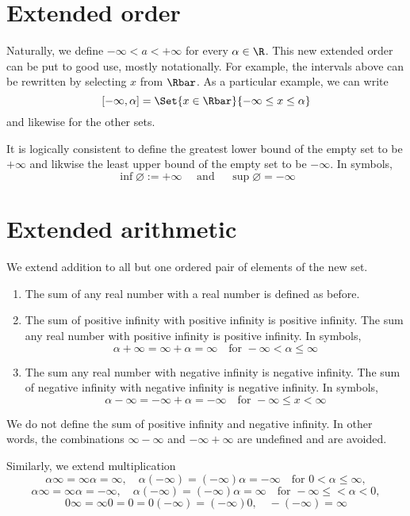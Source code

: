   \section*{Extended order}

Naturally, we define $-\infty < a < +\infty$ for every $\alpha \in \R $.
This new extended order can be put to good use, mostly notationally.
For example, the intervals above can be rewritten by selecting $x$ from $\Rbar$.
As a particular example, we can write
\[
[-\infty, \alpha ] =\Set{x \in \Rbar}{-\infty \leq x \leq \alpha }
\]
and likewise for the other sets.

It is logically consistent to define the greatest lower bound of the empty set to be $+\infty$ and likwise the least upper bound of the empty set to be $-\infty$.
In symbols,
\[
\inf \varnothing := +\infty \quad \text{ and } \quad \sup \varnothing = -\infty
\]

  \section*{Extended arithmetic}

We extend addition to all but one ordered pair of elements of the new set.
    \begin{enumerate}
      \item The sum of any real number with a real number is defined as before.
      \item The sum of positive infinity with positive infinity is positive infinity.
The sum any real number with positive infinity is positive infinity.
In symbols,
\[
\alpha  + \infty = \infty + \alpha  = \infty \quad \text{for } -\infty < \alpha  \leq \infty
\]
      \item The sum any real number with negative infinity is negative infinity.
The sum of negative infinity with negative infinity is negative infinity.
In symbols,
\[
\alpha  - \infty = -\infty + \alpha  = -\infty \quad \text{for } -\infty \leq x < \infty
\]
    \end{enumerate}
We do not define the sum of positive infinity and negative infinity.
In other words, the combinations $\infty - \infty$ and $-\infty + \infty$ are undefined and are avoided.

Similarly, we extend multiplication
\[
\alpha \infty = \infty\alpha  = \infty, \quad \alpha (-\infty) = (-\infty)\alpha  = -\infty \quad \text{for } 0 < \alpha  \leq \infty,
\]
\[
\alpha \infty = \infty\alpha  = -\infty, \quad \alpha (-\infty) = (-\infty)\alpha  = \infty \quad \text{for } -\infty \leq < \alpha  < 0,
\]
\[
0\infty = \infty0 = 0 = 0(-\infty) = (-\infty)0, \quad -(-\infty) = \infty
\]

